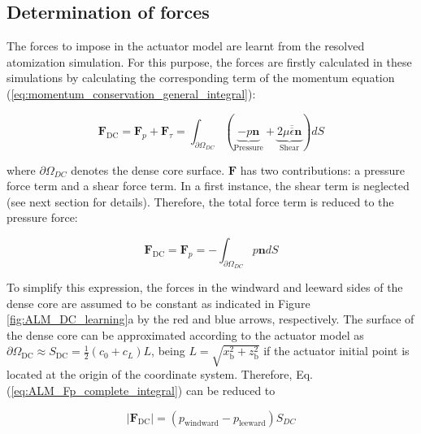 \subsection{Determination of forces}
\label{subsec:ch4_ALM_forces_determination}

The forces to impose in the actuator model are learnt from the resolved atomization simulation. For this purpose, the forces are firstly calculated in these simulations by calculating the corresponding term of the momentum equation (\ref{eq:momentum_conservation_general_integral}):

\begin{equation}
\boldsymbol{F}_\mathrm{DC} = \boldsymbol{F}_p + \boldsymbol{F}_\tau = \int_{\partial \Omega_{DC}} \left( \underbrace{- p \boldsymbol{n}}_{\mathrm{Pressure}} + \underbrace{2 \mu \overline{\overline{\epsilon}} \boldsymbol{n}}_{\mathrm{Shear}}  \right) dS 
\end{equation}

where $\partial \Omega_{DC}$ denotes the dense core surface. $\boldsymbol{F} $ has two contributions: a pressure force term and a shear force term. In a first instance, the shear term is neglected (see next section for details). Therefore, the total force term is reduced to the pressure force:

\begin{equation}
\label{eq:ALM_Fp_complete_integral}
\boldsymbol{F}_\mathrm{DC} = \boldsymbol{F}_p = - \int_{\partial \Omega_{DC}} p \boldsymbol{n} dS 
\end{equation}

To simplify this expression, the forces in the windward and leeward sides of the dense core are assumed to be constant as indicated in Figure \ref{fig:ALM_DC_learning}a by the red and blue arrows, respectively. The surface of the dense core can be approximated according to the actuator model as $\partial \Omega_\mathrm{DC} \approx S_\mathrm{DC} = \frac{1}{2} \left( c_0 + c_L \right) L$, being $L = \sqrt{x_\mathrm{b}^2+z_\mathrm{b}^2}$ if the actuator initial point is located at the origin of the coordinate system. Therefore, Eq. (\ref{eq:ALM_Fp_complete_integral}) can be reduced to


\begin{equation}
\label{eq:ALM_Fp_calculation_simplified}
\boxed{
|\boldsymbol{F}_\mathrm{DC}| = \left( p_\mathrm{windward} - p_\mathrm{leeward} \right) S_{DC} 
}
\end{equation}



